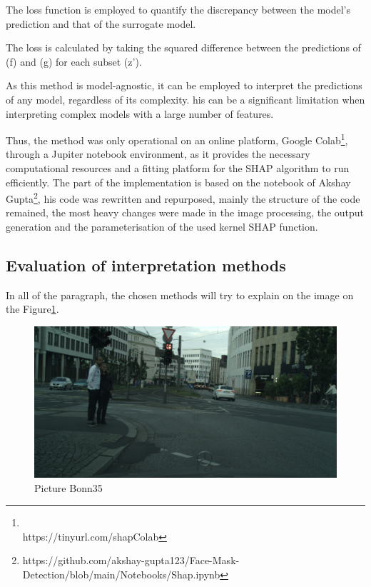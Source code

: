 The loss function is employed to quantify the discrepancy between the model's prediction and that of the surrogate model.

The loss is calculated by taking the squared difference between the predictions of (f) and (g) for each subset (z').



As this method is model-agnostic, it can be employed to interpret the predictions of any model, regardless of its complexity.
his can be a significant limitation when interpreting complex models with a large number of features.

Thus, the method was only operational on an online platform, Google
Colab\footnote{\\https://tinyurl.com/shapColab}, through a Jupiter notebook environment, as it provides
the necessary computational resources and a fitting platform for the SHAP algorithm to run efficiently.
The part of the implementation is based on the notebook of Akshay Gupta\footnote{https://github.com/akshay-gupta123/Face-Mask-Detection/blob/main/Notebooks/Shap.ipynb}, his code was rewritten and repurposed, mainly the structure of the code remained, the most heavy changes were made in the image processing, the output generation and the parameterisation of the used kernel SHAP function.

\subsection{Evaluation of interpretation methods}\label{subsec:evaluation-of-interpretation-methods}


In all of the paragraph, the chosen methods will try to explain on the image on the Figure\ref{fig:bonn35}.
\begin{figure}[h]
    \centering
    \includegraphics[width=1\linewidth]{figures/bonn_000035_000019_leftImg8bit_original}
    \caption{Picture Bonn35 }
    \label{fig:bonn35}
\end{figure}

